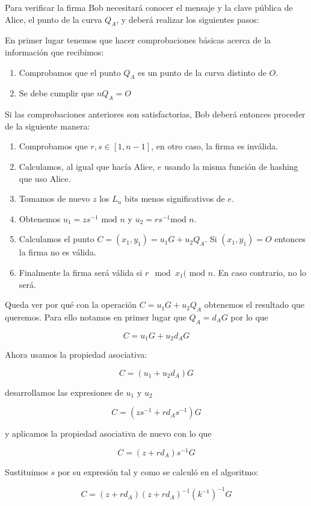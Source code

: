\documentclass{article}
\begin{document}
Para verificar la firma Bob necesitará conocer el mensaje y la clave
pública de Alice, el punto de la curva $Q_A$, y deberá realizar los
siguientes pasos:

En primer lugar tenemos que hacer comprobaciones básicas acerca de la
información que recibimos:

\begin{enumerate}
\item Comprobamos que el punto $Q_A$ es un punto de la curva distinto
de $O$.
\item Se debe cumplir que $nQ_A=O$
\end{enumerate}

Si las comprobaciones anteriores son satisfactorias, Bob deberá
entonces proceder de la siguiente manera:

\begin{enumerate}
\item Comprobamos que $r,s\in[1, n-1]$, en otro caso, la firma es
inválida.
\item Calculamos, al igual que hacía Alice, $e$ usando la misma
función de hashing que uso Alice.
\item Tomamos de nuevo $z$ los $L_n$ bits menos significativos de $e$.
\item Obtenemos $u_1 = zs^{-1} \text{ mod } n$ y $u_2 = rs^{-1} \text{
mod } n$.
\item Calculamos el punto $C = (x_1,y_1)=u_1G+u_2Q_A$. Si $(x_1,
y_1)=O$ entonces la firma no es válida.
\item Finalmente la firma será válida si $r\mod x_1 ( \text{ mod }
n$. En caso contrario, no lo será.
\end{enumerate}

Queda ver por qué con la operación $C=u_1G+u_2Q_A$ obtenemos el
resultado que queremos. Para ello notamos en primer lugar que
$Q_A=d_AG$ por lo que

\[ C=u_1G+u_2d_AG
\]

Ahora usamos la propiedad asociativa:

\[ C = (u_1+u_2d_A)G
\]

desarrollamos las expresiones de $u_1$ y $u_2$

\[ C = (zs^{-1}+rd_As^{-1})G
\]

y aplicamos la propiedad asociativa de nuevo con lo que

\[ C = (z+rd_A)s^{-1}G
\]

Sustituimos $s$ por su expresión tal y como se calculó en el
algoritmo:

\[ C = (z+rd_A)(z+rd_A)^{-1}(k^{-1})^{-1}G
\]
\end{document}
